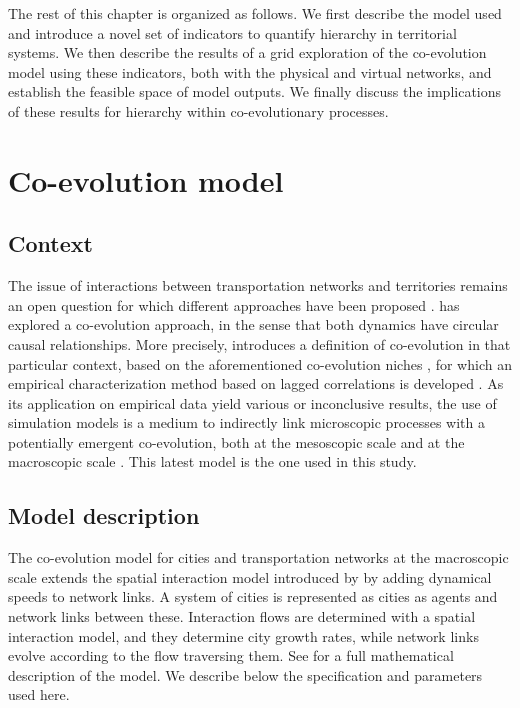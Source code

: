 \documentclass[english,fleqn,allpages]{ISTE_science}[2018/07/30]
\begin{document}
The rest of this chapter is organized as follows. We first describe the model used and introduce a novel set of indicators to quantify hierarchy in territorial systems. We then describe the results of a grid exploration of the co-evolution model using these indicators, both with the physical and virtual networks, and establish the feasible space of model outputs. We finally discuss the implications of these results for hierarchy within co-evolutionary processes.


\section{Co-evolution model}

\subsection{Context}

The issue of interactions between transportation networks and territories remains an open question for which different approaches have been proposed \cite{offner1993effets,espacegeo2014effets}. \cite{raimbault2018caracterisation} has explored a co-evolution approach, in the sense that both dynamics have circular causal relationships. More precisely, \cite{raimbault2019modeling} introduces a definition of co-evolution in that particular context, based on the aforementioned co-evolution niches \citep{holland2012signals}, for which an empirical characterization method based on lagged correlations is developed \citep{raimbault2017identification}. As its application on empirical data yield various or inconclusive results, the use of simulation models is a medium to indirectly link microscopic processes with a potentially emergent co-evolution, both at the mesoscopic scale \citep{raimbault2019urban} and at the macroscopic scale \citep{raimbault2018modeling}. This latest model is the one used in this study.

\subsection{Model description}

The co-evolution model for cities and transportation networks at the macroscopic scale extends the spatial interaction model introduced by \cite{raimbault2018indirect} by adding dynamical speeds to network links. A system of cities is represented as cities as agents and network links between these. Interaction flows are determined with a spatial interaction model, and they determine city growth rates, while network links evolve according to the flow traversing them. See \cite{raimbault2018modeling} for a full mathematical description of the model. We describe below the specification and parameters used here.
\end{document}
